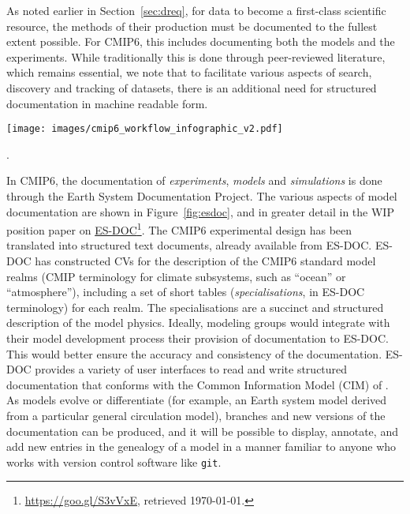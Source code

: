 \documentclass[gmd,manuscript]{copernicus}
\newcommand{\pllabel}[1]{\label{p-#1}\linelabel{l-#1}}
\newcommand{\urlref}[2] {\href{#1}{#2}\footnote{\url{#1}, retrieved \today.}}
\begin{document}
As noted earlier in Section~\ref{sec:dreq}, for data to become a
first-class scientific resource, the methods of their production must
be documented to the fullest extent possible. For CMIP6, this includes
documenting both the models and the experiments. While traditionally
this is done through peer-reviewed literature, which remains
essential, we note that to facilitate various aspects of search,
discovery and tracking of datasets, there is an additional need for
structured documentation in machine readable form.

\begin{figure*}
  \begin{center}
    \texttt{[image: images/cmip6\_workflow\_infographic\_v2.pdf]}
  \end{center}
  \caption{Elements of ES-DOC documentation. Rows indicate phases of
    the modeling process being documented, and box colors indicate the
    parties responsible for producing the documentation (see legend).
    Figure courtesy Guillaume Levavasseur, IPSL}.
  \label{fig:esdoc}
\end{figure*}

In CMIP6, the documentation of \emph{experiments}, \emph{models} and
\emph{simulations} is done through the Earth System Documentation
\citep[\urlref{https://goo.gl/WNwKD9}{ES-DOC},][]{ref:guilyardietal2013}
Project. The various aspects of model documentation are shown in
Figure~\ref{fig:esdoc}, and in greater detail in the WIP position
paper on \urlref{https://goo.gl/S3vVxE}{ES-DOC}. The CMIP6
experimental design has been translated into structured text
documents, already available from ES-DOC. ES-DOC has constructed CVs
for the description of the CMIP6 standard model realms
\pllabel{RC1-52}
(CMIP terminology for climate subsystems, such as ``ocean'' or
``atmosphere''), including a set of short tables
(\emph{specialisations}, in ES-DOC terminology) for each realm.
\pllabel{RC1-53}
The specialisations are a succinct and structured description of the
model physics. Ideally, modeling groups would integrate with their
model development process their provision of documentation to ES-DOC.
This would better ensure the accuracy and consistency of the
documentation. ES-DOC provides a variety of user interfaces to read
and write structured documentation that conforms with the Common
Information Model (CIM) of \cite{ref:lawrenceetal2012}. As models
evolve or differentiate (for example, an Earth system model derived
from a particular general circulation model), branches and new
versions of the documentation can be produced,
\pllabel{RC1-54}
and it will be possible to display, annotate, and add new entries in
the genealogy of a model in a manner familiar to anyone who works with
version control software like \texttt{git}.
\end{document}
